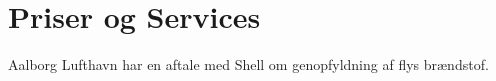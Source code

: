 \section{Priser og Services}

Aalborg Lufthavn har en aftale med Shell om genopfyldning af flys brændstof.

